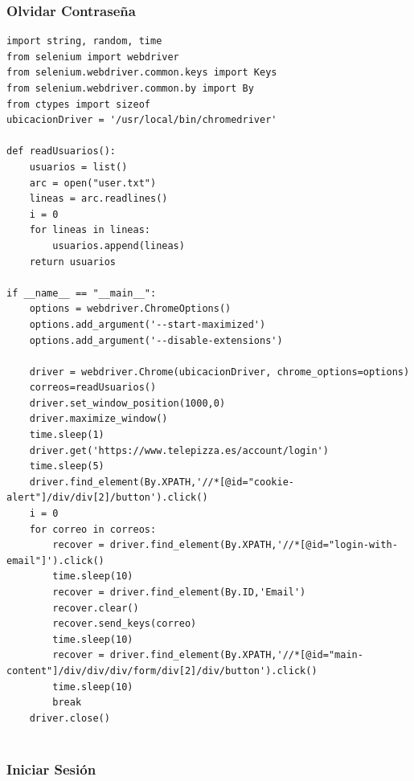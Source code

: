 \documentclass{article}
\begin{document}
\subsubsection{Olvidar Contraseña}
\begin{lstlisting}[lenguaje=py]
import string, random, time
from selenium import webdriver
from selenium.webdriver.common.keys import Keys
from selenium.webdriver.common.by import By
from ctypes import sizeof
ubicacionDriver = '/usr/local/bin/chromedriver'

def readUsuarios():
    usuarios = list()
    arc = open("user.txt")
    lineas = arc.readlines()
    i = 0   
    for lineas in lineas:
        usuarios.append(lineas)
    return usuarios

if __name__ == "__main__":
    options = webdriver.ChromeOptions()
    options.add_argument('--start-maximized')
    options.add_argument('--disable-extensions')

    driver = webdriver.Chrome(ubicacionDriver, chrome_options=options)
    correos=readUsuarios()
    driver.set_window_position(1000,0)
    driver.maximize_window()
    time.sleep(1)
    driver.get('https://www.telepizza.es/account/login')
    time.sleep(5)
    driver.find_element(By.XPATH,'//*[@id="cookie-alert"]/div/div[2]/button').click()
    i = 0
    for correo in correos:
        recover = driver.find_element(By.XPATH,'//*[@id="login-with-email"]').click()        
        time.sleep(10)
        recover = driver.find_element(By.ID,'Email')
        recover.clear()
        recover.send_keys(correo)
        time.sleep(10)
        recover = driver.find_element(By.XPATH,'//*[@id="main-content"]/div/div/div/form/div[2]/div/button').click()
        time.sleep(10)
        break
    driver.close()


\end{lstlisting}

\subsubsection{ Iniciar Sesión}
\end{document}
